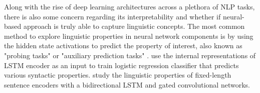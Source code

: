\documentclass[11pt]{article}
\begin{document}





Along with the rise of deep learning architectures across a plethora of NLP tasks, there is also some concern regarding its interpretability and whether if neural-based approach is truly able to capture linguistic concepts. The most common method to explore linguistic properties in neural network components is by using the hidden state activations to predict the property of interest, also known as "probing tasks" \parencite{conneau-etal-2018-cram} or "auxiliary prediction tasks" \parencite{auxilliarypredictiontasks}. \parencite{shi2016string} use the internal representations of LSTM encoder as an input to train logistic regression classifier that predicts various syntactic properties. \parencite{conneau-etal-2018-cram} study the linguistic properties of fixed-length sentence encoders with a bidirectional LSTM and gated convolutional networks.
\end{document}
